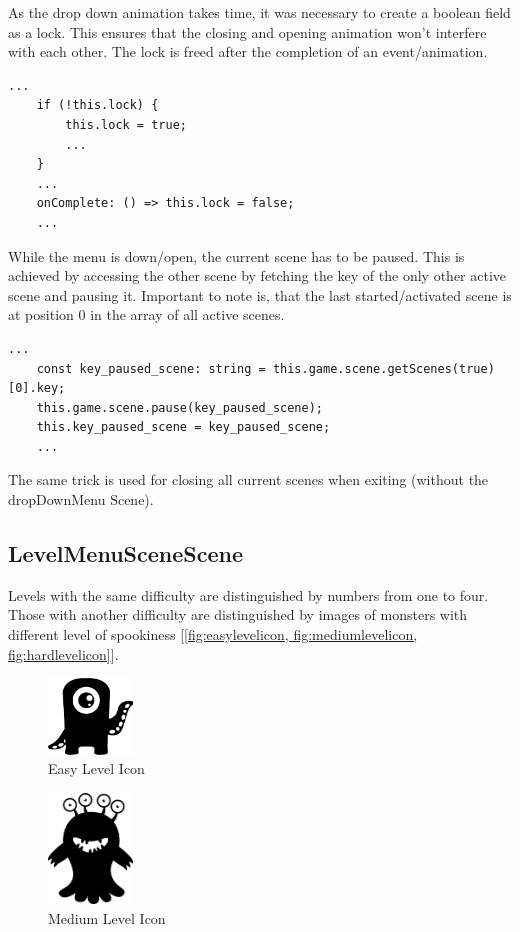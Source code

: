 As the drop down animation takes time, it was necessary to create a boolean field as a lock.
This ensures that the closing and opening animation won't interfere with each other.
The lock is freed after the completion of an event/animation.

\begin{lstlisting}[style=TypeScript, caption={Lock acquiring and freeing}]
    ...
    if (!this.lock) {
        this.lock = true;
        ...
    }
    ...
    onComplete: () => this.lock = false;
    ...
\end{lstlisting}

While the menu is down/open, the current scene has to be paused.
This is achieved by accessing the other scene by fetching the key of the only other active scene and pausing it.
Important to note is, that the last started/activated scene is at position 0 in the array of all active scenes.
\begin{lstlisting}[style=TypeScript, caption={Fetching current active scene}]
    ...
    const key_paused_scene: string = this.game.scene.getScenes(true)[0].key;
    this.game.scene.pause(key_paused_scene);
    this.key_paused_scene = key_paused_scene;
    ...
\end{lstlisting}

The same trick is used for closing all current scenes when exiting (without the dropDownMenu Scene).

\subsection{LevelMenuSceneScene}\label{subsec:levelmenuscenescene}
Levels with the same difficulty are distinguished by numbers from one to four.
Those with another difficulty are distinguished by images of monsters with different level of spookiness
[\ref{fig:easylevelicon, fig:mediumlevelicon, fig:hardlevelicon}].

\begin{figure}[H]
    \centering
    \includegraphics[width=0.2\textwidth]{figures/easylevelicon}
    \caption{Easy Level Icon}
    \label{fig:easylevelicon}
\end{figure}

\begin{figure}[H]
    \centering
    \includegraphics[width=0.2\textwidth]{figures/mediumlevelicon}
    \caption{Medium Level Icon}
    \label{fig:mediumlevelicon}
\end{figure}

